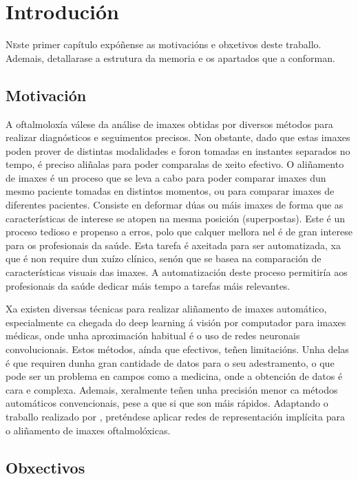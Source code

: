 \chapter{Introdución}
\label{chap:introducion}

\lettrine{N} este primer capítulo expóñense as motivacións e obxetivos deste traballo. Ademais, detallarase a estrutura da memoria e os apartados que a conforman.

\section{Motivación}
\label{sec:motivacion}

A oftalmoloxía válese da análise de imaxes obtidas por diversos métodos para realizar diagnósticos e seguimentos precisos.
Non obstante, dado que estas imaxes poden prover de distintas modalidades e foron tomadas en instantes separados no tempo, é preciso aliñalas para poder comparalas de xeito efectivo.
O aliñamento de imaxes é un proceso que se leva a cabo para poder comparar imaxes dun mesmo paciente tomadas en distintos momentos, ou para comparar imaxes de diferentes pacientes.
Consiste en deformar dúas ou máis imaxes de forma que as características de interese se atopen na mesma posición (superpostas).
Este é un proceso tedioso e propenso a erros, polo que calquer mellora nel é de gran interese para os profesionais da saúde. 
Esta tarefa é axeitada para ser automatizada, xa que é non require dun xuízo clínico, senón que se basea na comparación de características visuais das imaxes. A automatización deste proceso permitiría aos profesionais da saúde dedicar máis tempo a tarefas máis relevantes.

Xa existen diversas técnicas para realizar aliñamento de imaxes automático, especialmente ca chegada do deep learning á visión por computador para imaxes médicas, onde unha aproximación habitual é o uso de redes neuronais convolucionais.
Estos métodos, aínda que efectivos, teñen limitacións. Unha delas é que requiren dunha gran cantidade de datos para o seu adestramento, o que pode ser un problema en campos como a medicina, onde a obtención de datos é cara e complexa. Ademais, xeralmente teñen unha precisión menor ca métodos automáticos convencionais, pese a que si que son máis rápidos.
Adaptando o traballo realizado por \cite{wolterink2021implicit}, preténdese aplicar redes de representación implícita para o aliñamento de imaxes oftalmolóxicas.

\section{Obxectivos}

